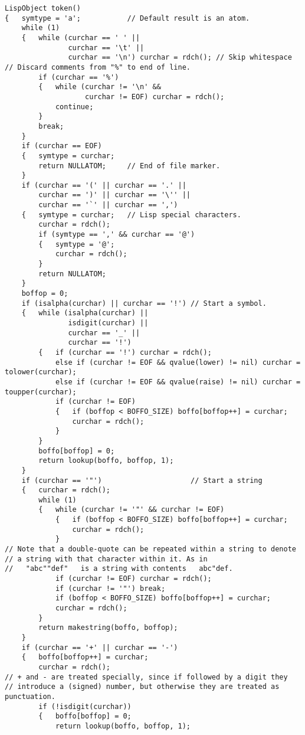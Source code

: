{\begin{verbatim}
LispObject token()
{   symtype = 'a';           // Default result is an atom.
    while (1)
    {   while (curchar == ' ' ||
               curchar == '\t' ||
               curchar == '\n') curchar = rdch(); // Skip whitespace
// Discard comments from "%" to end of line.
        if (curchar == '%')
        {   while (curchar != '\n' &&
                   curchar != EOF) curchar = rdch();
            continue;
        }
        break;
    }
    if (curchar == EOF)
    {   symtype = curchar;
        return NULLATOM;     // End of file marker.
    }
    if (curchar == '(' || curchar == '.' ||
        curchar == ')' || curchar == '\'' ||
        curchar == '`' || curchar == ',')
    {   symtype = curchar;   // Lisp special characters.
        curchar = rdch();
        if (symtype == ',' && curchar == '@')
        {   symtype = '@';
            curchar = rdch();
        }
        return NULLATOM;
    }
    boffop = 0;
    if (isalpha(curchar) || curchar == '!') // Start a symbol.
    {   while (isalpha(curchar) ||
               isdigit(curchar) ||
               curchar == '_' ||
               curchar == '!')
        {   if (curchar == '!') curchar = rdch();
            else if (curchar != EOF && qvalue(lower) != nil) curchar = tolower(curchar);
            else if (curchar != EOF && qvalue(raise) != nil) curchar = toupper(curchar);
            if (curchar != EOF)
            {   if (boffop < BOFFO_SIZE) boffo[boffop++] = curchar;
                curchar = rdch();
            }
        }
        boffo[boffop] = 0;
        return lookup(boffo, boffop, 1);
    }
    if (curchar == '"')                     // Start a string
    {   curchar = rdch();
        while (1)
        {   while (curchar != '"' && curchar != EOF)
            {   if (boffop < BOFFO_SIZE) boffo[boffop++] = curchar;
                curchar = rdch();
            }
// Note that a double-quote can be repeated within a string to denote
// a string with that character within it. As in
//   "abc""def"   is a string with contents   abc"def.
            if (curchar != EOF) curchar = rdch();
            if (curchar != '"') break;
            if (boffop < BOFFO_SIZE) boffo[boffop++] = curchar;
            curchar = rdch();
        }
        return makestring(boffo, boffop);
    }
    if (curchar == '+' || curchar == '-')
    {   boffo[boffop++] = curchar;
        curchar = rdch();
// + and - are treated specially, since if followed by a digit they
// introduce a (signed) number, but otherwise they are treated as punctuation.
        if (!isdigit(curchar))
        {   boffo[boffop] = 0;
            return lookup(boffo, boffop, 1);

\end{verbatim}}
